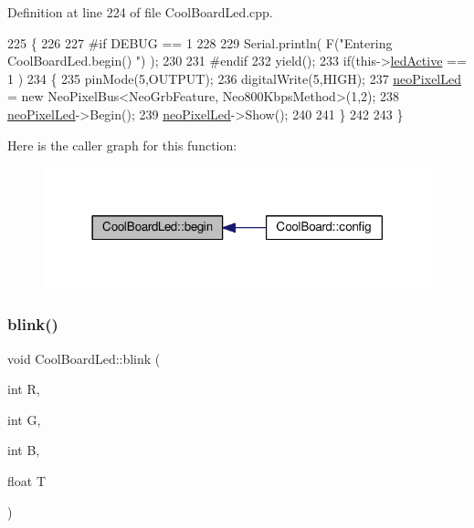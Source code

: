 Definition at line 224 of file Cool\+Board\+Led.\+cpp.


\begin{DoxyCode}
225 \{
226 
227 \textcolor{preprocessor}{#if DEBUG == 1}
228 
229     Serial.println( F(\textcolor{stringliteral}{"Entering CoolBoardLed.begin() "}) );
230 
231 \textcolor{preprocessor}{#endif}
232     yield();
233     \textcolor{keywordflow}{if}(this->\hyperlink{class_cool_board_led_a5f17c135516fcf4b44ea8a096ba0177a}{ledActive} == 1 )
234     \{
235         pinMode(5,OUTPUT);
236         digitalWrite(5,HIGH);
237         \hyperlink{class_cool_board_led_ac2c13fa462a010cd9242bf297c013923}{neoPixelLed} = \textcolor{keyword}{new} NeoPixelBus<NeoGrbFeature, Neo800KbpsMethod>(1,2); 
238         \hyperlink{class_cool_board_led_ac2c13fa462a010cd9242bf297c013923}{neoPixelLed}->Begin();
239         \hyperlink{class_cool_board_led_ac2c13fa462a010cd9242bf297c013923}{neoPixelLed}->Show();
240 
241     \}
242 
243 \} 
\end{DoxyCode}
Here is the caller graph for this function\+:\nopagebreak
\begin{figure}[H]
\begin{center}
\leavevmode
\includegraphics[width=318pt]{de/dc0/class_cool_board_led_ae3cbde8affcc6f011cbd698c8ef911f6_icgraph}
\end{center}
\end{figure}
\mbox{\label{class_cool_board_led_a96e1ea13003eee34c9dbcef340404426}} 
\subsubsection{\texorpdfstring{blink()}{blink()}}
{\footnotesize\ttfamily void Cool\+Board\+Led\+::blink (\begin{DoxyParamCaption}\item[{int}]{R,  }\item[{int}]{G,  }\item[{int}]{B,  }\item[{float}]{T }\end{DoxyParamCaption})}

